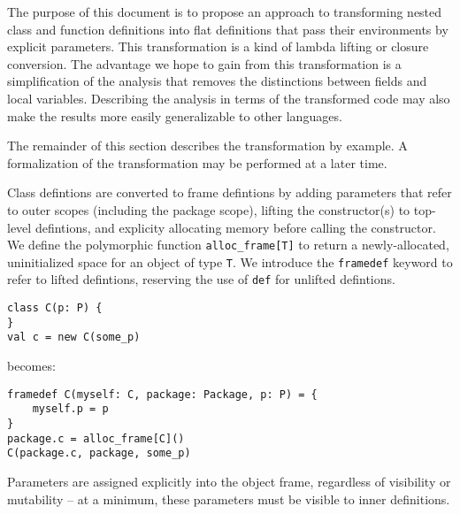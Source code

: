 \documentclass[letterpaper,11pt]{article}
\newcommand{\code}[1]{\lstinline$#1$}
\begin{document}
The purpose of this document is to propose an approach to transforming nested class and function
definitions into flat definitions that pass their environments by explicit parameters.
This transformation is a kind of lambda lifting or closure conversion.
The advantage we hope to gain from this transformation is a simplification of the analysis
that removes the distinctions between fields and local variables.
Describing the analysis in terms of the transformed code may also make the results
more easily generalizable to other languages.

The remainder of this section describes the transformation by example.
A formalization of the transformation may be performed at a later time.

\begin{comment}
Questions that may be worth discussing include:
\begin{itemize}
\item Are the proposed tranformation examples correct and preserving of all necessary semantics?
\item Do we care about the distinction between \code{val} and \code{var} in the analysis?
\item How can we prove what we need to prove about immutability?
\end{itemize}
\end{comment}

Class defintions are converted to frame defintions by
adding parameters that refer to outer scopes (including the package scope),
lifting the constructor(s) to top-level defintions,
and explicity allocating memory before calling the constructor.
We define the polymorphic function \code{alloc_frame[T]} to return a newly-allocated,
uninitialized space for an object of type \code{T}.
We introduce the \code{framedef} keyword to refer to lifted defintions,
reserving the use of \code{def} for unlifted defintions.

\begin{lstlisting}
class C(p: P) {
}
val c = new C(some_p)
\end{lstlisting}

becomes:

\begin{lstlisting}
framedef C(myself: C, package: Package, p: P) = {
	myself.p = p
}
package.c = alloc_frame[C]()
C(package.c, package, some_p)
\end{lstlisting}

Parameters are assigned explicitly into the object frame, regardless of visibility
or mutability -- at a minimum, these parameters must be visible to inner definitions.
\end{document}
